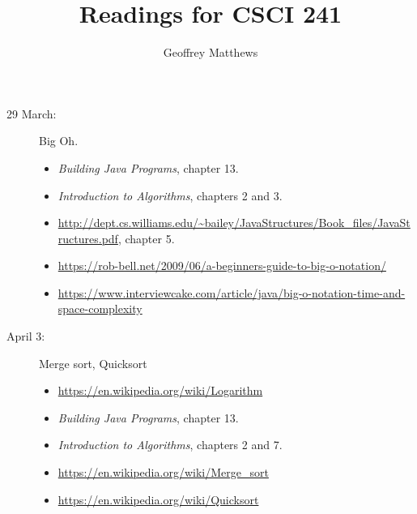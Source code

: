 \documentclass{article}
\title{Readings for CSCI 241}
\author{Geoffrey Matthews}
\begin{document}
\maketitle
\begin{description}
\item[29 March:]  Big Oh.
  
  \begin{itemize}
    \item {\em Building Java Programs}, chapter 13.
    \item {\em Introduction to Algorithms}, chapters 2 and 3.
      \item \url{http://dept.cs.williams.edu/~bailey/JavaStructures/Book_files/JavaStructures.pdf}, chapter 5.
  \item \url{https://rob-bell.net/2009/06/a-beginners-guide-to-big-o-notation/}
    \item \url{https://www.interviewcake.com/article/java/big-o-notation-time-and-space-complexity}
  \end{itemize}

\item[April 3:] Merge sort, Quicksort
  \begin{itemize}
\item \url{https://en.wikipedia.org/wiki/Logarithm}
    \item {\em Building Java Programs}, chapter 13.
  \item {\em Introduction to Algorithms}, chapters 2 and 7.
  \item\url{https://en.wikipedia.org/wiki/Merge_sort}
    \item\url{https://en.wikipedia.org/wiki/Quicksort}
  \end{itemize}

\end{description}
\end{document}
